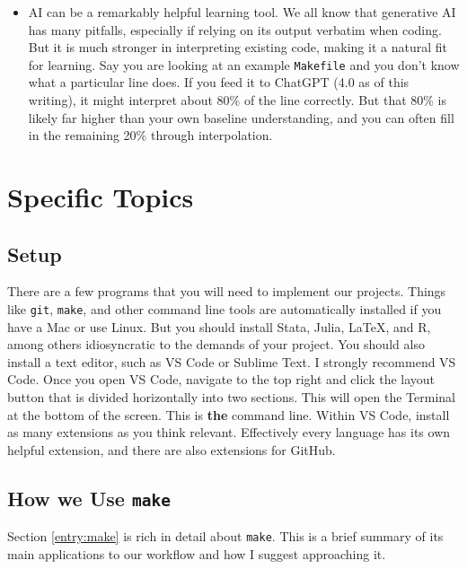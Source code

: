 \begin{itemize}
\item AI can be a remarkably helpful learning tool.
We all know that generative AI has many pitfalls, 
especially if relying on its output verbatim when coding.
But it is much stronger in interpreting existing code, 
making it a natural fit for learning. 
Say you are looking at an example \texttt{Makefile} and you don't know what a particular line does.
If you feed it to ChatGPT (4.0 as of this writing), 
it might interpret about 80\% of the line correctly.
But that 80\% is likely far higher than your own baseline understanding, 
and you can often fill in the remaining 20\% through interpolation.

\end{itemize}

\section{Specific Topics}

\subsection{Setup}

There are a few programs that you will need to implement our projects. 
Things like \texttt{git}, \texttt{make}, 
and other command line tools are automatically installed if you have a Mac or use Linux.
But you should install Stata, Julia, \LaTeX, and R, 
among others idiosyncratic to the demands of your project. 
You should also install a text editor, such as VS Code or Sublime Text.
I strongly recommend VS Code. 
Once you open VS Code, navigate to the top right 
and click the layout button that is divided horizontally into two sections.
This will open the Terminal at the bottom of the screen. 
This is \textbf{the} command line. 
Within VS Code, install as many extensions as you think relevant. 
Effectively every language has its own helpful extension, and there are also extensions for GitHub.

\subsection{How we Use \texttt{make}}

Section \ref{entry:make} is rich in detail about \texttt{make}. 
This is a brief summary of its main applications 
to our workflow and how I suggest approaching it.

